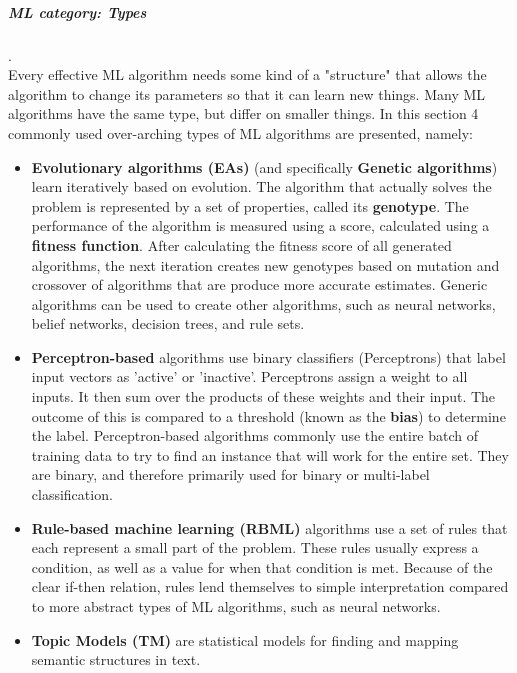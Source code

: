 \subparagraph{ML category: Types}
.\\
Every effective ML algorithm needs some kind of a "structure" that allows the algorithm to change its parameters so that it can learn new things. Many ML algorithms have the same type, but differ on smaller things. In this section 4 commonly used over-arching types of ML algorithms are presented, namely:
\begin{itemize}
	\item \textbf{Evolutionary algorithms (EAs)} (and 
		specifically \textbf{Genetic algorithms}) learn iteratively based on evolution. The algorithm that actually solves the problem is represented by a set of properties, called its \textbf{genotype}. The performance of the algorithm is measured using a score, calculated using a \textbf{fitness function}. After calculating the fitness score of all generated algorithms, the next iteration creates new genotypes based on mutation and crossover of algorithms that are produce more accurate estimates. Generic algorithms can be used to create other algorithms, such as neural networks, belief networks, decision trees, and rule sets.
	\item \textbf{Perceptron-based}
		algorithms use binary classifiers (Perceptrons) that label input vectors as 'active' or 'inactive'. Perceptrons assign a weight to all inputs. It then sum over the products of these weights and their input. The outcome of this is compared to a threshold (known as the \textbf{bias}) to determine the label. Perceptron-based algorithms commonly use the entire batch of training data to try to find an instance that will work for the entire set. They are binary, and therefore primarily used for binary or multi-label classification.
	\item \textbf{Rule-based machine learning (RBML)}
		algorithms use a set of rules that each represent a small part of the problem. These rules usually express a condition, as well as a value for when that condition is met. Because of the clear if-then relation, rules lend themselves to simple interpretation compared to more abstract types of ML algorithms, such as neural networks.
	\item \textbf{Topic Models (TM)}
		are statistical models for finding and mapping semantic structures in text.
\end{itemize}

